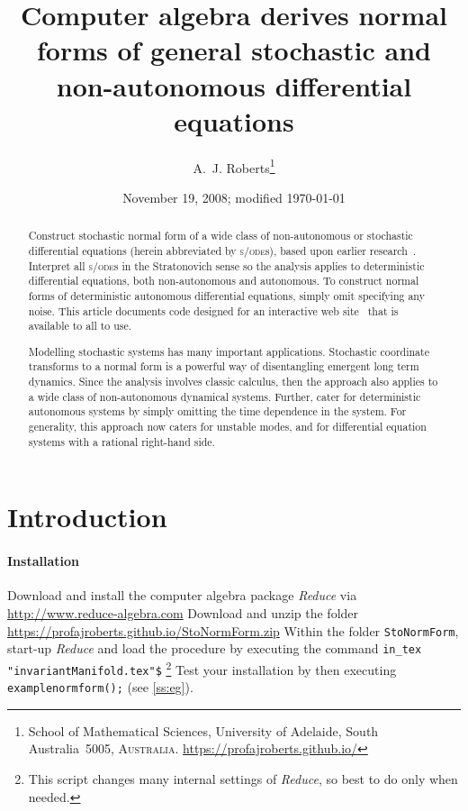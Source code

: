 \documentclass[11pt,a5paper]{article}
\title{Computer algebra derives normal forms of general stochastic and non-autonomous differential equations}
\author{A.~J. Roberts\thanks{School of Mathematical
Sciences, University of Adelaide, South Australia~5005,
\textsc{Australia}. \url{https://profajroberts.github.io/}}}
\date{November 19, 2008; modified \today}
\def\sde{\textsc{s/ode}}
\begin{document}
\sloppy

\maketitle

\begin{abstract}
Construct stochastic normal form of a wide class of non-autonomous or stochastic differential equations (herein abbreviated by \sde{}s), based upon earlier research~\cite[]{Cox91, Chao95, Roberts06k}.
Interpret all \sde{}s in the Stratonovich sense so the analysis applies to deterministic differential equations, both non-autonomous and autonomous.
To construct normal forms of deterministic autonomous differential equations, simply omit specifying any noise.
This article documents code designed for an interactive web site~\cite[]{Roberts07d} that is available to all to use.

Modelling stochastic systems has many important applications.
Stochastic coordinate transforms to a normal form is a powerful way of disentangling emergent long term dynamics.
Since the analysis involves classic calculus, then the approach also applies to a wide class of non-autonomous dynamical systems.
Further, cater for deterministic autonomous systems by simply omitting the time dependence in the system.
For generality, this approach now caters for unstable modes, and for differential equation systems with a rational right-hand side.
\end{abstract}

\tableofcontents

\section{Introduction}

\paragraph{Installation}
Download and install the computer algebra package
\emph{Reduce} via \url{http://www.reduce-algebra.com}\quad
Download and unzip the folder
\url{https://profajroberts.github.io/StoNormForm.zip}
\quad Within the folder \verb|StoNormForm|, start-up
\emph{Reduce} and load the procedure by executing the
command \verb|in_tex "invariantManifold.tex"$|
\footnote{This script changes many internal settings of
\emph{Reduce}, so best to do only when needed.} Test your
installation by then executing \verb|examplenormform();|
\quad(see \cref{ss:eg}).
\end{document}
